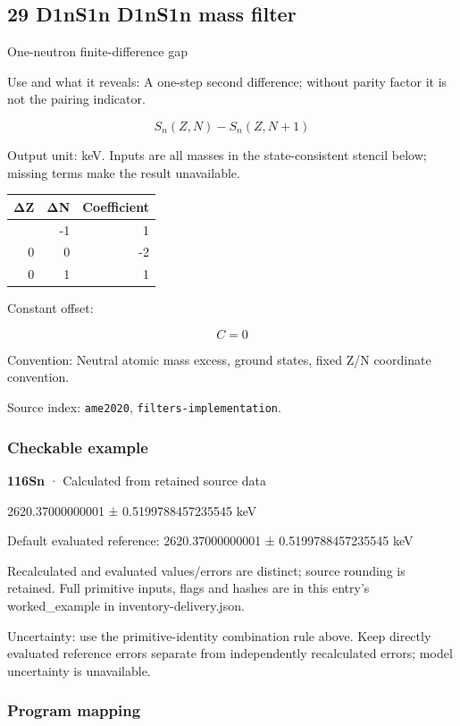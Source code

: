 \documentclass[
  11pt,
  letterpaper,
]{article}
\begin{document}
\subsection{29 D1nS1n D1nS1n mass
filter}\label{d1ns1n-d1ns1n-mass-filter}

One-neutron finite-difference gap

Use and what it reveals: A one-step second difference; without parity
factor it is not the pairing indicator.

\[
S_n(Z,N)-S_n(Z,N+1)
\]

Output unit: keV. Inputs are all masses in the state-consistent stencil
below; missing terms make the result unavailable.

\begin{longtable}[]{@{}rrr@{}}
\toprule\noalign{}
ΔZ & ΔN & Coefficient \\
\midrule\noalign{}
\endhead
\bottomrule\noalign{}
\endlastfoot
0 & -1 & 1 \\
0 & 0 & -2 \\
0 & 1 & 1 \\
\end{longtable}

Constant offset:

\[
C=0
\]

Convention: Neutral atomic mass excess, ground states, fixed Z/N
coordinate convention.

Source index: \texttt{ame2020}, \texttt{filters-implementation}.

\subsubsection{Checkable example}\label{checkable-example-28}

\textbf{116Sn} · Calculated from retained source data

2620.37000000001 ± 0.5199788457235545 keV

Default evaluated reference: 2620.37000000001 ± 0.5199788457235545 keV

Recalculated and evaluated values/errors are distinct; source rounding
is retained. Full primitive inputs, flags and hashes are in this entry's
worked\_example in inventory-delivery.json.

Uncertainty: use the primitive-identity combination rule above. Keep
directly evaluated reference errors separate from independently
recalculated errors; model uncertainty is unavailable.

\subsubsection{Program mapping}\label{program-mapping-28}
\end{document}
